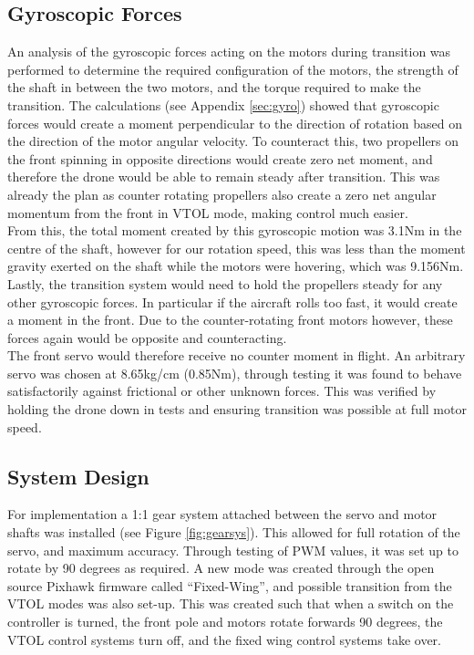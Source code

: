 \subsection{Gyroscopic Forces}
An analysis of the gyroscopic forces acting on the motors during transition was performed to determine the required configuration of the motors, the strength of the shaft in between the two motors, and the torque required to make the transition. The calculations (see Appendix  \ref{sec:gyro}) showed that gyroscopic forces would create a moment perpendicular to the direction of rotation based on the direction of the motor angular velocity. To counteract this, two propellers on the front spinning in opposite directions would create zero net moment, and therefore the drone would be able to remain steady after transition. This was already the plan as counter rotating propellers also create a zero net angular momentum from the front in VTOL mode, making control much easier.\\

From this, the total moment created by this gyroscopic motion was 3.1Nm in the centre of the shaft, however for our rotation speed, this was less than the moment gravity exerted on the shaft while the motors were hovering, which was 9.156Nm. Lastly, the transition system would need to hold the propellers steady for any other gyroscopic forces. In particular if the aircraft rolls too fast, it would create a moment in the front. Due to the counter-rotating front motors however, these forces again would be opposite and counteracting.\\

The front servo would therefore receive no counter moment in flight. An arbitrary servo was chosen at 8.65kg/cm (0.85Nm), through testing it was found to behave satisfactorily against frictional or other unknown forces. This was verified by holding the drone down in tests and ensuring transition was possible at full motor speed.

\subsection{System Design}
\label{sec:controller}
For implementation a 1:1 gear  system attached between the servo and motor shafts was installed (see Figure \ref{fig:gearsys}). This allowed for full rotation of the servo, and maximum accuracy.  Through testing of PWM values, it was set up to rotate by 90 degrees as required. A new mode was created through the open source Pixhawk firmware called “Fixed-Wing”, and possible transition from the VTOL modes was also set-up. This was created such that when a switch on the controller is turned, the front pole and motors rotate forwards 90 degrees, the VTOL control systems turn off, and the fixed wing control systems take over.\\

